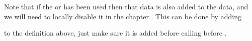\begin{sniplet}
\begin{lcode}
{  \setlength{\cftsubsectionindent}{\cftsectionnumwidth}
  \setlength{\cftsubsubsectionindent}{\cftsubsectionindent}
  \addtolength{\cftsubsubsectionindent}{\cftsubsectionnumwidth}
  \renewcommand\cftsectionfont{\small}
  \renewcommand\cftsectionpagefont{\small}
  \renewcommand\cftsubsectionfont{\small}
  \renewcommand\cftsubsectionpagefont{\small}
  \renewcommand\cftsubsubsectionfont{\small}
  \renewcommand\cftsubsubsectionpagefont{\small}
  \tableofcontents*
  \endgroup
  \setcounter{tocdepth}{\value{@memmarkcntra}}
  \m@mindentafterchapter
  \par\bigskip
  \@afterheading}
\makeatother
\end{lcode}
\end{sniplet}

Note that if the \cmd{\chapterprecistoc} or \cmd{\chapterprecis} has
been used then that data is also added to the \toc{} data, and we will
need to locally disable it in the chapter \toc{}. This can be done by
adding
\begin{lcode}
  \let\precistoctext\@gobble
\end{lcode}
to the \cmd{\chaptertoc} definition above, just make sure it is added
before calling
before \cmd{\tableofcontents*}.




